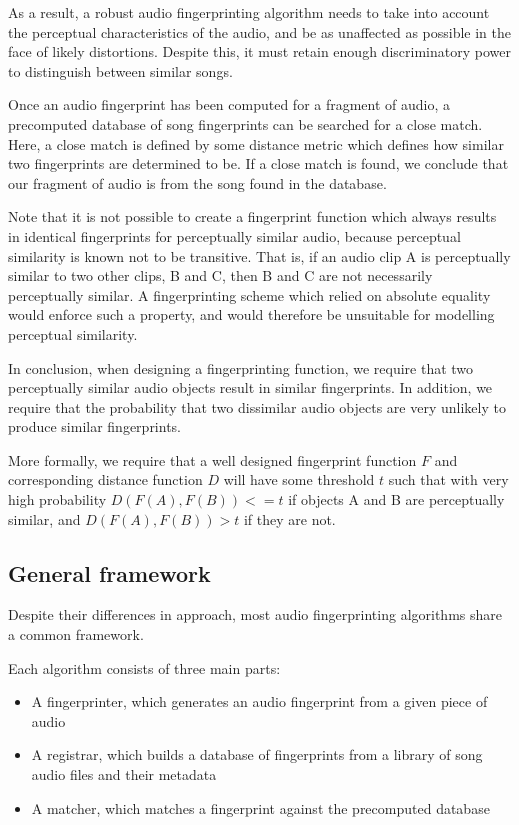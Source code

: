 \documentclass[12pt,a4paper,twoside,openright]{report}
\begin{document}
As a result, a robust audio fingerprinting algorithm needs to take into account the perceptual characteristics of the audio, and be as unaffected as possible in the face of likely distortions. Despite this, it must retain enough discriminatory power to distinguish between similar songs.

Once an audio fingerprint has been computed for a fragment of audio, a precomputed database of song fingerprints can be searched for a close match. Here, a close match is defined by some distance metric which defines how similar two fingerprints are determined to be. If a close match is found, we conclude that our fragment of audio is from the song found in the database.

Note that it is not possible to create a fingerprint function which always results in identical fingerprints for perceptually similar audio, because perceptual similarity is known not to be transitive. That is, if an audio clip A is perceptually similar to two other clips, B and C, then B and C are not necessarily perceptually similar. A fingerprinting scheme which relied on absolute equality would enforce such a property, and would therefore be unsuitable for modelling perceptual similarity.

In conclusion, when designing a fingerprinting function, we require that two perceptually similar audio objects result in similar fingerprints. In addition, we require that the probability that two dissimilar audio objects are very unlikely to produce similar fingerprints. 

More formally, we require that a well designed fingerprint function $F$ and corresponding distance function $D$ will have some threshold $t$ such that with very high probability $D(F(A),F(B)) <= t$ if objects A and B are perceptually similar, and $D(F(A),F(B)) > t$ if they are not.


\subsection{General framework}

Despite their differences in approach, most audio fingerprinting algorithms share a common framework.

Each algorithm consists of three main parts: 

\begin{itemize}
  \item A fingerprinter, which generates an audio fingerprint from a given piece of audio
  \item A registrar, which builds a database of fingerprints from a library of song audio files and their metadata
  \item A matcher, which matches a fingerprint against the precomputed database
\end{itemize}
\end{document}
